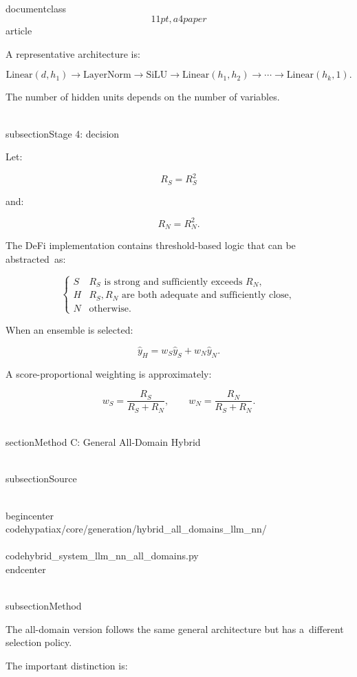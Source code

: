 \\documentclass\[11pt,a4paper\]{article}
\begin{document}
 A representative architecture is:

 $$
\mathrm{Linear}(d,h_1)
\rightarrow
\mathrm{LayerNorm}
\rightarrow
\mathrm{SiLU}
\rightarrow
\mathrm{Linear}(h_1,h_2)
\rightarrow
\cdots
\rightarrow
\mathrm{Linear}(h_k,1).
$$

 The number of hidden units depends on the number of variables.

 \\subsection{Stage 4: decision}

 Let:

 $$
R_S=R^2_S
$$

 and:

 $$
R_N=R^2_N.
$$

 The DeFi implementation contains threshold-based logic that can be abstracted\
 as:

 $$
\begin{cases}
S & R_S\text{ is strong and sufficiently exceeds }R_N,\\
H & R_S,R_N\text{ are both adequate and sufficiently close},\\
N & \text{otherwise}.
\end{cases}
$$

 When an ensemble is selected:

 $$
\hat y_H
=
w_S\hat y_S+w_N\hat y_N.
$$

 A score-proportional weighting is approximately:

 $$
w_S=
\frac{R_S}{R_S+R_N},
\qquad
w_N=
\frac{R_N}{R_S+R_N}.
$$

 \\section{Method C: General All-Domain Hybrid}\

 \\subsection{Source}

 \\begin{center}\
 \\code{hypatiax/core/generation/hybrid\_all\_domains\_llm\_nn/}\\\
 \\code{hybrid\_system\_llm\_nn\_all\_domains.py}\
 \\end{center}

 \\subsection{Method}

 The all-domain version follows the same general architecture but has a\
 different selection policy.

 The important distinction is:
\end{document}
